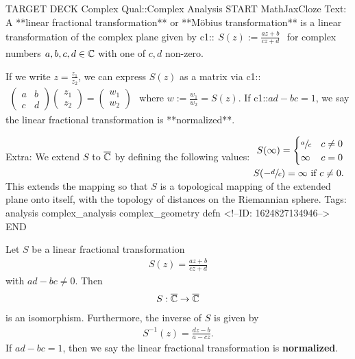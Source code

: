 \documentclass{memoir}
\begin{document}
\begin{anki}
TARGET DECK
Complex Qual::Complex Analysis
START
MathJaxCloze
Text: A **linear fractional transformation** or **Möbius transformation** is a linear transformation of the complex plane given by
{{c1::\(\begin{align*}
        	S(z) := \frac{az+b}{cz+d}
        \end{align*}\)}}
for complex numbers \(a,b,c,d \in \mathbb{C}\) with one of \(c,d\) non-zero.

If we write \(z = \frac{z_1}{z_2}\), we can express \(S(z)\) as a matrix via
{{c1::\(\begin{align*}
		\begin{pmatrix} a & b \\ c & d \end{pmatrix} \begin{pmatrix} z_1 \\ z_2 \end{pmatrix} = \begin{pmatrix} w_1 \\ w_2 \end{pmatrix} 
	\end{align*}\)}} 
where \(w := \frac{w_1}{w_2} = S(z)\). If {{c1::\(ad-bc = 1\)}}, we say the linear fractional transformation is **normalized**.

Extra: We extend \(S\) to \(\overline{\mathbb{C}}\) by defining the following values:
\(\begin{align*}
  	S(\infty) = \begin{cases}
  		\sfrac{a}{c} & c\neq 0\\
  		\infty & c=0
  	\end{cases}\\
  	S(-\sfrac{d}{c}) = \infty \text{ if }c\neq 0.
  \end{align*}\)
This extends the mapping so that \(S\) is a topological mapping of the extended plane onto itself, with the topology of distances on the Riemannian sphere.
Tags: analysis complex_analysis complex_geometry defn
<!--ID: 1624827134946-->
END
\end{anki}

\begin{prop}
	Let \(S\) be a linear fractional transformation
	\begin{align*}
		S(z) = \frac{az+b}{c z + d}
	\end{align*}
	with \(ad-bc\neq 0\). Then
	\begin{align*}
		S:\overline{\mathbb{C}}\to \overline{\mathbb{C}}
	\end{align*}
	is an isomorphism. Furthermore, the inverse of \(S\) is given by
	\begin{align*}
		S^{-1}(z) = \frac{dz -b}{a-cz}.
	\end{align*}
	If \(ad-bc = 1\), then we say the linear fractional transformation is \textbf{normalized}.
\end{prop}
\end{document}
